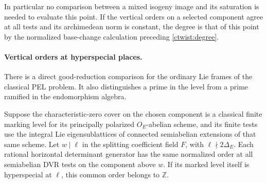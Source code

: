 In particular no comparison between a mixed isogeny image and
its saturation is needed to evaluate this point. If the vertical
orders on a selected component agree at all tests and its
archimedean norm is constant, the degree is that of this point
by the normalized base-change calculation preceding
\eqref{ctwist:degree}.

\paragraph{Vertical orders at hyperspecial places.}
There is a direct good-reduction comparison for the ordinary Lie
frames of the classical PEL problem. It also distinguishes a prime
in the level from a prime ramified in the endomorphism algebra.

\begin{proposition}\label{cmeig:hyperspecial}
Suppose the characteristic-zero cover on the chosen component
is a classical finite marking level for its principally polarized
\(O_E\)-abelian scheme, and its finite tests use the integral Lie
eigensublattices of connected semiabelian extensions of that same
scheme. Let \(w\mid\ell\) in the splitting coefficient field \(F\),
with \(\ell\nmid 2\Delta_E\). Each rational horizontal determinant
generator has the same normalized order at all semiabelian DVR
tests on the component above \(w\). If its marked level itself is
hyperspecial at \(\ell\), this common order belongs to \(\mathbb Z\).
\end{proposition}
